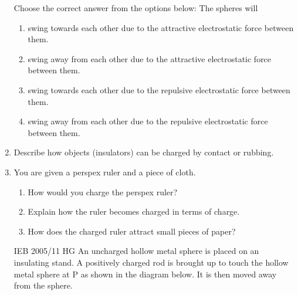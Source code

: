 \begin{enumerate}[noitemsep, label=\textbf{\arabic*}. ]
\begin{figure}[H]
\begin{center}
      \vspace{2pt}
    \vspace{.1in}
    
    \end{center}

 \end{figure}   

    \addtocounter{footnote}{-0}
    
Choose the correct answer from the options below:
The spheres will
\label{m38781*id202176}\begin{enumerate}[noitemsep, label=\textbf{\alph*}. ] 
            \label{m38781*uid28}\item swing towards each other due to the attractive electrostatic force between them.
\label{m38781*uid29}\item swing away from each other due to the attractive electrostatic force between them.
\label{m38781*uid30}\item swing towards each other due to the repulsive electrostatic force between them.
\label{m38781*uid31}\item swing away from each other due to the repulsive electrostatic force between them.
\end{enumerate}
        \newline
            \label{m38781*uid32}\item Describe how objects (insulators) can be charged by contact or rubbing.\newline
            
\label{m38781*uid33}\item You are given a perspex ruler and a piece of cloth.
\label{m38781*id202255}\begin{enumerate}[noitemsep, label=\textbf{\alph*}. ] 
            \label{m38781*uid34}\item How would you charge the perspex ruler?
\label{m38781*uid35}\item Explain how the ruler becomes charged in terms of charge.
\label{m38781*uid36}\item How does the charged ruler attract small pieces of paper?
\end{enumerate}
        \newline
            \label{m38781*uid37}\item [IEB 2005/11 HG] An uncharged hollow metal sphere is placed on an insulating stand. A positively charged rod is brought up to touch the hollow metal sphere at P as shown in the diagram below. It is then moved away from the sphere.


\end{enumerate}
